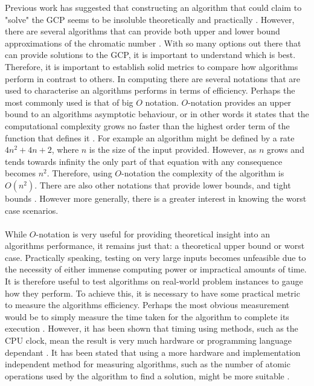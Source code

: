 Previous work has suggested that constructing an algorithm that could claim to "solve" the GCP seems to be insoluble theoretically and practically \cite{WelshPowell}. However, there are several algorithms that can provide both upper and lower bound approximations of the chromatic number \cite{MaxClique, MaxClique2, CulbersonColoring, LEWISHillClimber}. With so many options out there that can provide solutions to the GCP, it is important to understand which is best. Therefore, it is important to establish solid metrics to compare how algorithms perform in contrast to others. In computing there are several notations that are used to characterise an algorithms performs in terms of efficiency. Perhaps the most commonly used is that of big $O$ notation. $O$-notation provides an upper bound to an algorithms asymptotic behaviour, or in other words it states that the computational complexity grows no faster than the highest order term of the function that defines it \cite{IntroAlgs}. For example an algorithm might be defined by a rate $4n^2 + 4n + 2$, where $n$ is the size of the input provided. However, as $n$ grows and tends towards infinity the only part of that equation with any consequence becomes $n^2$. Therefore, using $O$-notation the complexity of the algorithm is $O(n^2)$. There are also other notations that provide lower bounds, and tight bounds \cite{IntroAlgs}. However more generally, there is a greater interest in knowing the worst case scenarios. 
\\\\
While $O$-notation is very useful for providing theoretical insight into an algorithms performance, it remains just that: a theoretical upper bound or worst case. Practically speaking, testing on very large inputs becomes unfeasible due to the necessity of either immense computing power or impractical amounts of time. It is therefore useful to test algorithms on real-world problem instances to gauge how they perform. To achieve this, it is necessary to have some practical metric to measure the algorithms efficiency. Perhaps the most obvious measurement would be to simply measure the time taken for the algorithm to complete its execution \cite{Kronsjo, Leighton1979AGC}. However, it has been shown that timing using methods, such as the CPU clock, mean the result is very much hardware or programming language dependant \cite{Eiben, LewisR.M.R2015AGtG}. It has been stated that using a more hardware and implementation independent method for measuring algorithms, such as the number of atomic operations used by the algorithm to find a solution, might be more suitable \cite{Eiben, LewisR.M.R2015AGtG}.  

